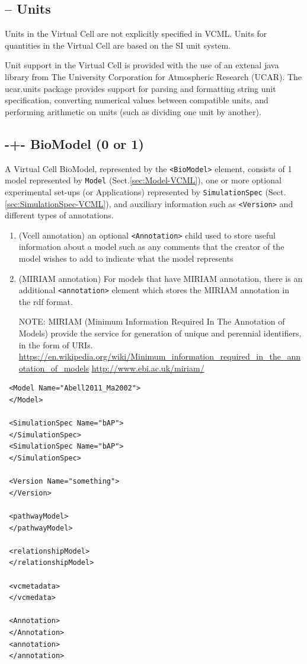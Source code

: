 \subsection{-- Units}

Units in the Virtual Cell are not explicitly specified in VCML. Units for
quantities in the Virtual Cell are based on the SI unit system.

Unit support in the Virtual Cell is provided with the use of an extenal java
library from The University Corporation for Atmospheric Research (UCAR). The
ucar.units package provides support for parsing and formatting string unit
specification, converting numerical values between compatible units, and
performing arithmetic on units (such as dividing one unit by another).    


\subsection{-+- BioModel (0 or 1)}
\label{sec:BioModel-VCML}

A Virtual Cell BioModel, represented by the \verb!<BioModel>! element, consists
of 1 model represented by \verb!Model! (Sect.\ref{sec:Model-VCML}), one or
more optional experimental set-ups (or Applications) represented by
\verb!SimulationSpec! (Sect.\ref{sec:SimulationSpec-VCML}), and auxiliary
information such as \verb!<Version>! and different types of annotations.
\begin{enumerate}
  \item (Vcell annotation) an optional \verb!<Annotation>! child used to store
  useful information about a model such as any comments that the creator of the model wishes to add to
  indicate what the model represents  
  
  \item (MIRIAM annotation) For models that have MIRIAM annotation, there is an
  additional \verb!<annotation>! element which stores the MIRIAM annotation in the rdf
  format.
  
NOTE: MIRIAM (Minimum Information Required In The Annotation of Models) provide
the  service for generation of unique and perennial identifiers, in the form of URIs.
\url{https://en.wikipedia.org/wiki/Minimum_information_required_in_the_annotation_of_models}
\url{http://www.ebi.ac.uk/miriam/}
\end{enumerate}


\begin{verbatim}
 <Model Name="Abell2011_Ma2002">
 </Model>

 <SimulationSpec Name="bAP">
 </SimulationSpec>
 <SimulationSpec Name="bAP">
 </SimulationSpec>

 <Version Name="something">
 </Version>
 
 <pathwayModel>
 </pathwayModel>
 
 <relationshipModel>
 </relationshipModel>
 
 <vcmetadata>
 </vcmedata>
 
 <Annotation>
 </Annotation>
 <annotation>
 </annotation>
\end{verbatim}
 
